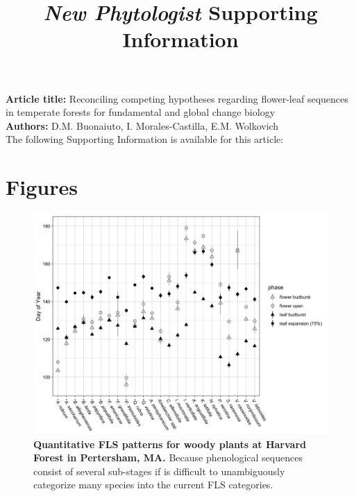 \documentclass[11pt]{article}
\title{\textit{New Phytologist} Supporting Information}
\date{}
\begin{document}
\maketitle

\noindent \textbf{Article title:} Reconciling competing hypotheses regarding flower-leaf sequences in temperate forests for fundamental and global change biology\\
\noindent \textbf{Authors:} D.M. Buonaiuto, I. Morales-Castilla, E.M. Wolkovich\\

\noindent The following Supporting Information is available for this article:\\

\pagebreak[4]

\section*{Figures}


\begin{figure}[H]
    \centering
 \includegraphics[width=\textwidth]{..//..//HarvardForest/HFmeans_expanded.jpeg} 
    \caption{\textbf{Quantitative FLS patterns for woody plants at Harvard Forest in Pertersham, MA.} Because phenological sequences consist of several sub-stages if is difficult to unambiguously categorize many species into the current FLS categories. }
    \label{fig:HFmeans}
\end{figure}
\end{document}
